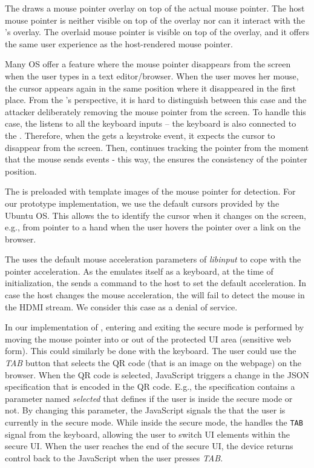  The \device draws a mouse pointer overlay on top of the actual mouse pointer. The host mouse pointer is neither visible on top of the overlay nor can it interact with the \device's overlay. The overlaid mouse pointer is visible on top of the overlay, and it offers the same user experience as the host-rendered mouse pointer.


 Many OS offer a feature where the mouse pointer disappears from the screen when the user types in a text editor/browser. When the user moves her mouse, the cursor appears again in the same position where it disappeared in the first place. From the \device's perspective, it is hard to distinguish between this case and the attacker deliberately removing the mouse pointer from the screen. To handle this case, the \device listens to all the keyboard inputs -- the keyboard is also connected to the \device. Therefore, when the \device gets a keystroke event, it expects the cursor to disappear from the screen. Then, \device continues tracking the pointer from the moment that the mouse sends events  - this way, the \device ensures the consistency of the pointer position.  


 The \device is preloaded with template images of the mouse pointer for detection. For our \name prototype implementation, we use the default cursors provided by the Ubuntu OS. This allows the \device to identify the cursor when it changes on the screen, e.g., from pointer to a hand when the user hovers the pointer over a link on the browser. 

 
 The \device uses the default mouse acceleration parameters of \emph{libinput} to cope with the pointer acceleration. As the \device emulates itself as a keyboard, at the time of initialization, the \device sends a command to the host to set the default acceleration. In case the host changes the mouse acceleration, the \device will fail to detect the mouse in the HDMI stream. We consider this case as a denial of service.

 In our implementation of \name, entering and exiting the secure mode is performed by moving the mouse pointer into or out of the protected UI area (sensitive web form). 
This could similarly be done with the keyboard.
The user could use the \emph{TAB} button that selects the QR code (that is an image on the webpage) on the browser. When the QR code is selected, \name JavaScript triggers a change in the JSON specification that is encoded in the QR code. E.g., the specification contains a parameter named \emph{selected} that defines if the user is inside the secure mode or not. By changing this parameter, the \name JavaScript signals the \device that the user is currently in the secure mode. While inside the secure mode, the \device handles the \texttt{TAB} signal from the keyboard, allowing the user to switch UI elements within the secure UI. When the user reaches the end of the secure UI, the device returns control back to the \name JavaScript when the user presses \emph{TAB}.


